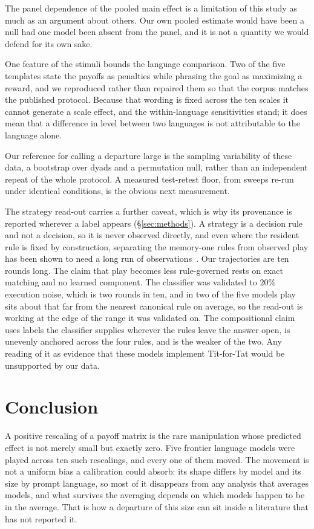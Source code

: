 \documentclass[11pt,a4paper]{article}
\begin{document}
The panel dependence of the pooled main effect is a limitation of this study as
much as an argument about others. Our own pooled estimate would have been a null
had one model been absent from the panel, and it is not a quantity we would
defend for its own sake.

One feature of the stimuli bounds the language comparison. Two of the five
templates state the payoffs as penalties while phrasing the goal as maximizing a
reward, and we reproduced rather than repaired them so that the corpus matches
the published protocol. Because that wording is fixed across the ten scales it
cannot generate a scale effect, and the within-language sensitivities stand; it
does mean that a difference in level between two languages is not attributable
to the language alone.

Our reference for calling a departure large is the sampling variability of these
data, a bootstrap over dyads and a permutation null, rather than an independent
repeat of the whole protocol. A measured test-retest floor, from
sweeps re-run under identical conditions, is the obvious next measurement.

The strategy read-out carries a further caveat, which is why its provenance is
reported wherever a label appears (\S\ref{sec:methods}). A strategy is a decision
rule and not a decision, so it is never observed directly, and even where the
resident rule is fixed by construction, separating the memory-one rules from
observed play has been shown to need a long run of
observations~\citep{kim2021win}. Our trajectories are ten rounds long. The claim that play
becomes less rule-governed rests on exact matching and no learned component.
The classifier was validated to $20\%$ execution noise, which is two rounds in
ten, and in two of the five models play sits about that far from the nearest
canonical rule on average, so the read-out is working at the edge of the range
it was validated on.
The compositional claim uses labels the classifier supplies wherever the rules
leave the answer open, is unevenly anchored across the four rules, and is the
weaker of the two. Any reading of it as evidence that these models implement
Tit-for-Tat would be unsupported by our data.

\section{Conclusion}
\label{sec:conclusion}

A positive rescaling of a payoff matrix is the rare manipulation whose
predicted effect is not merely small but exactly zero. Five frontier language
models were played across ten such rescalings, and every one of them moved. The
movement is not a uniform bias a calibration could absorb: its shape differs by
model and its size by prompt language, so most of it disappears from any
analysis that averages models, and what survives the averaging depends on which
models happen to be in the average. That is how a departure of this size can
sit inside a literature that has not reported it.
\end{document}
